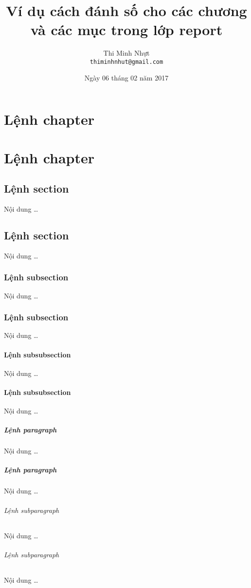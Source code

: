 \documentclass[12pt,a4paper]{report}
\title{\bfseries \huge Ví dụ cách đánh số cho các chương và các mục trong lớp report}
\author{\Large Thi Minh Nhựt \bigskip \\  \Large \texttt{thiminhnhut@gmail.com}}
\date{\Large Ngày 06 tháng 02 năm 2017}
\begin{document}
\maketitle
\tableofcontents
\thispagestyle{empty}
\newpage

\chapter{Lệnh chapter}
\chapter{Lệnh chapter}

\section{Lệnh section}
Nội dung \ldots
\section{Lệnh section}
Nội dung \ldots

\subsection{Lệnh subsection}
Nội dung \ldots
\subsection{Lệnh subsection}
Nội dung \ldots

\subsubsection{Lệnh subsubsection}
Nội dung \ldots
\subsubsection{Lệnh subsubsection}
Nội dung \ldots

\paragraph{Lệnh paragraph}
Nội dung \ldots
\paragraph{Lệnh paragraph}
Nội dung \ldots

\subparagraph{Lệnh subparagraph}
Nội dung \ldots
\subparagraph{Lệnh subparagraph}
Nội dung \ldots
\end{document}
